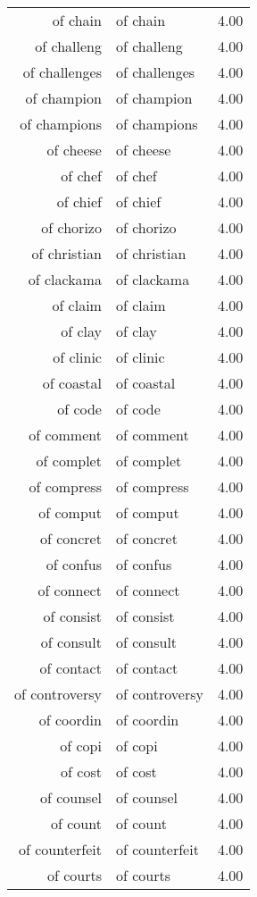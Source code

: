 \begin{table}[ht]
\begin{tabular}{rlr}
  of chain & of chain & 4.00 \\ 
  of challeng & of challeng & 4.00 \\ 
  of challenges & of challenges & 4.00 \\ 
  of champion & of champion & 4.00 \\ 
  of champions & of champions & 4.00 \\ 
  of cheese & of cheese & 4.00 \\ 
  of chef & of chef & 4.00 \\ 
  of chief & of chief & 4.00 \\ 
  of chorizo & of chorizo & 4.00 \\ 
  of christian & of christian & 4.00 \\ 
  of clackama & of clackama & 4.00 \\ 
  of claim & of claim & 4.00 \\ 
  of clay & of clay & 4.00 \\ 
  of clinic & of clinic & 4.00 \\ 
  of coastal & of coastal & 4.00 \\ 
  of code & of code & 4.00 \\ 
  of comment & of comment & 4.00 \\ 
  of complet & of complet & 4.00 \\ 
  of compress & of compress & 4.00 \\ 
  of comput & of comput & 4.00 \\ 
  of concret & of concret & 4.00 \\ 
  of confus & of confus & 4.00 \\ 
  of connect & of connect & 4.00 \\ 
  of consist & of consist & 4.00 \\ 
  of consult & of consult & 4.00 \\ 
  of contact & of contact & 4.00 \\ 
  of controversy & of controversy & 4.00 \\ 
  of coordin & of coordin & 4.00 \\ 
  of copi & of copi & 4.00 \\ 
  of cost & of cost & 4.00 \\ 
  of counsel & of counsel & 4.00 \\ 
  of count & of count & 4.00 \\ 
  of counterfeit & of counterfeit & 4.00 \\ 
  of courts & of courts & 4.00 \\ 

\end{tabular}
\end{table}
